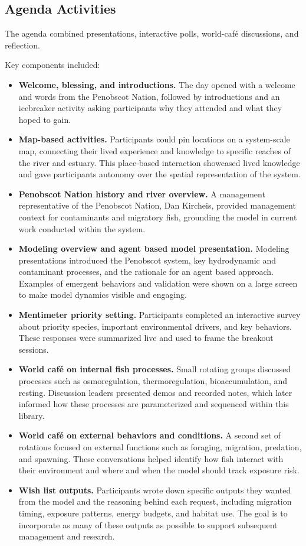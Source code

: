 \documentclass[
]{book}
\begin{document}
\subsection{Agenda Activities}\label{agenda-activities}

The agenda combined presentations, interactive polls, world-café discussions, and reflection.

Key components included:

\begin{itemize}
\item
  \textbf{Welcome, blessing, and introductions.} The day opened with a welcome and words from the Penobscot Nation, followed by introductions and an icebreaker activity asking participants why they attended and what they hoped to gain.
\item
  \textbf{Map-based activities.} Participants could pin locations on a system-scale map, connecting their lived experience and knowledge to specific reaches of the river and estuary. This place-based interaction showcased lived knowledge and gave participants autonomy over the spatial representation of the system.
\item
  \textbf{Penobscot Nation history and river overview.} A management representative of the Penobscot Nation, Dan Kircheis, provided management context for contaminants and migratory fish, grounding the model in current work conducted within the system.
\item
  \textbf{Modeling overview and agent based model presentation.} Modeling presentations introduced the Penobscot system, key hydrodynamic and contaminant processes, and the rationale for an agent based approach. Examples of emergent behaviors and validation were shown on a large screen to make model dynamics visible and engaging.
\item
  \textbf{Mentimeter priority setting.} Participants completed an interactive survey about priority species, important environmental drivers, and key behaviors. These responses were summarized live and used to frame the breakout sessions.
\item
  \textbf{World café on internal fish processes.} Small rotating groups discussed processes such as osmoregulation, thermoregulation, bioaccumulation, and resting. Discussion leaders presented demos and recorded notes, which later informed how these processes are parameterized and sequenced within this library.
\item
  \textbf{World café on external behaviors and conditions.} A second set of rotations focused on external functions such as foraging, migration, predation, and spawning. These conversations helped identify how fish interact with their environment and where and when the model should track exposure risk.
\item
  \textbf{Wish list outputs.} Participants wrote down specific outputs they wanted from the model and the reasoning behind each request, including migration timing, exposure patterns, energy budgets, and habitat use. The goal is to incorporate as many of these outputs as possible to support subsequent management and research.
\end{itemize}
\end{document}
